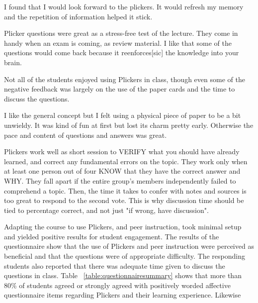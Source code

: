 \documentclass[12pt]{article}
\begin{document}
\begin{displayquote}
I found that I would look forward to the plickers. It would refresh my memory and the repetition of information helped it stick. 
\end{displayquote}

\begin{displayquote}
Plicker questions were great as a stress-free test of the lecture. They come in handy when an exam is coming, as review material. I like that some of the questions would come back because it reenforces[sic] the knowledge into your brain.
\end{displayquote}

Not all of the students enjoyed using Plickers in class, though even some of the negative feedback was largely on the use of the paper cards and the time to discuss the questions.

\begin{displayquote}
I like the general concept but I felt using a physical piece of paper to be a bit unwieldy. It was kind of fun at first but lost its charm pretty early. Otherwise the pace and content of questions and answers was great.
\end{displayquote}

\begin{displayquote}
Plickers work well as short session to VERIFY what you should have already learned, and correct any fundamental errors on the topic. They work only when at least one person out of four KNOW that they have the correct answer and WHY. They fall apart if the entire group's members independently failed to comprehend a topic. Then, the time it takes to confer with notes and sources is too great to respond to the second vote. This is why discussion time should be tied to percentage correct, and not just "if wrong, have discussion".
\end{displayquote}

Adapting the course to use Plickers, and peer instruction, took minimal setup and yielded positive results for student engagement. The results of the questionnaire show that the use of Plickers and peer instruction were perceived as beneficial and that the questions were of appropriate difficulty. The responding students also reported that there was adequate time given to discuss the questions in class. Table ~\ref{table:questionnairesummary} shows that more than 80\% of students agreed or strongly agreed with positively worded affective questionnaire items regarding Plickers and their learning experience. Likewise 
\end{document}
